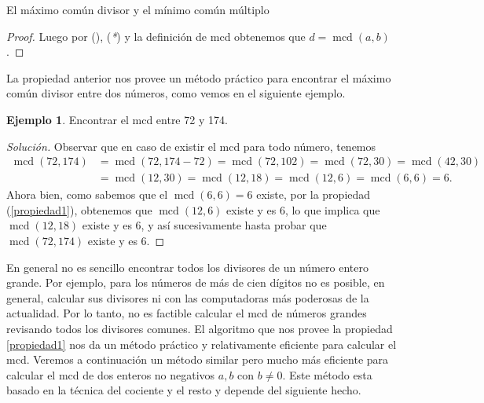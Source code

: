\documentclass[11pt,spanish,makeidx]{amsbook}
\theoremstyle{definition}
\newtheorem{ejemplo}{Ejemplo}[section]
\theoremstyle{remark}
\newcommand \mcd{\operatorname{mcd}}
\begin{document}
\begin{section}{El máximo común divisor y el mínimo común múltiplo}
\begin{proof}

\noindent Luego por ({\em *}), ({\em **}) y la definición de mcd obtenemos que $d = \mcd(a,b)$.
\end{proof}

La propiedad anterior nos provee un método práctico para encontrar el máximo común divisor entre dos números, como vemos en el siguiente ejemplo.

\begin{ejemplo} Encontrar el mcd entre 72 y 174.
\begin{proof}[Solución] Observar que en caso de existir el mcd para todo número, tenemos
\begin{align*}
\mcd(72, 174) &= \mcd(72,174-72) = \mcd(72,102) = \mcd(72,30) =  \mcd(42, 30) \\&= \mcd(12,30) = \mcd(12,18)= \mcd(12,6)= \mcd(6,6) = 6.  
\end{align*}
Ahora bien, como sabemos que el $\mcd(6,6)=6$ existe, por la propiedad (\ref{propiedad1}), obtenemos que $\mcd(12,6) $ existe y es $6$, lo que implica que 
$\mcd(12,18)$ existe y es $6$, y así sucesivamente hasta probar que $\mcd(72, 174)$ existe y es $6$.
\end{proof}
\end{ejemplo} 

En  general no es sencillo encontrar todos los divisores de un número entero grande. Por ejemplo, para los  números de más de cien dígitos no es posible,  en general, calcular sus divisores ni con las computadoras más poderosas de la actualidad. Por  lo tanto, no es factible calcular el  mcd de números grandes revisando todos los divisores comunes.  El algoritmo que nos provee la  propiedad \ref{propiedad1} nos da un método práctico y relativamente eficiente para calcular el mcd. Veremos a continuación un método similar pero mucho más eficiente para calcular el mcd de dos enteros no negativos $a,b$ con $b \not=0$. Este método esta basado en la técnica del cociente y el resto y depende del siguiente hecho.


\end{section}
\end{document}
